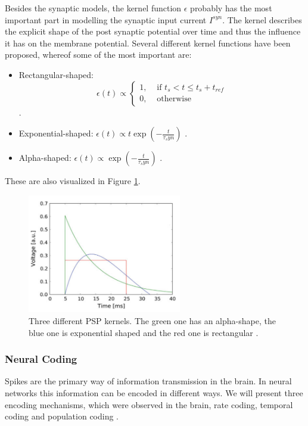 Besides the synaptic models, the kernel function $\epsilon$ probably has the most important part in modelling the synaptic input current $I^{syn}$. 
The kernel describes the explicit shape of the post synaptic potential over time and thus the influence it has on the membrane potential.
Several different kernel functions have been proposed, whereof some of the most important are:
\begin{itemize}
\item Rectangular-shaped: \[\epsilon(t) \propto  \begin{cases} 1, & \text{ if } t_{s} < t \le t_{s} + t_{ref} \\ 0, & \text{ otherwise } \end{cases} \] .
\item Exponential-shaped: $\epsilon(t) \propto t \exp(- \frac{t}{\tau_syn})$ .
\item Alpha-shaped: $\epsilon(t) \propto \exp(- \frac{t}{\tau_syn})$ .
\end{itemize}

These are also visualized in Figure \ref{fig:pspkernels}.

\begin{figure}
	\centering
    	\includegraphics[width=0.6\textwidth]{imgs/psp_kernel.png} 
    \caption[PSP kernels.]{Three different PSP kernels. The green one has an alpha-shape, the blue one is exponential shaped and the red one is rectangular \cite{Petrovici2016}. }
	\label{fig:pspkernels}
\end{figure}

\subsubsection{Neural Coding} \label{c:neuralcoding}

Spikes are the primary way of information transmission in the brain.
In neural networks this information can be encoded in different ways.
We will present three encoding mechanisms, which were observed in the brain, rate coding, temporal coding and population coding \cite{Meftah2013}.

